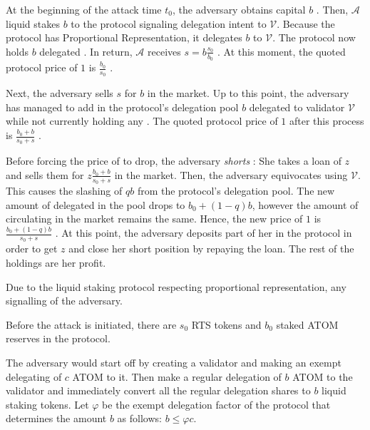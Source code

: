 At the beginning of the attack time $t_0$, the adversary obtains capital
$b$ \asset. Then, $\mathcal{A}$
liquid stakes $b$ \asset to the protocol
signaling delegation intent to $\mathcal{V}$. Because the
protocol has Proportional Representation, it delegates $b$ \asset to $\mathcal{V}$.
The protocol now holds $b$ delegated \asset.
In return, $\mathcal{A}$ receives $s = b \frac{s_0}{b_0}$ \stasset.
At this moment, the quoted protocol price of $1$ \stasset is
$\frac{b_0}{s_0}$ \asset.

Next, the adversary sells $s$ \stasset for $b$ \asset in the market.
Up to this point, the adversary
has managed to add in the protocol's delegation pool $b$
\asset delegated to validator $\mathcal{V}$ while not currently holding
any \stasset. The quoted protocol price of $1$ \stasset after this process
is $\frac{b_0 + b}{s_0 + s}$ \asset.

Before forcing the price of \stasset to drop, the adversary \emph{shorts}
\stasset: She takes a loan of $z$ \stasset and sells them for
$z \frac{b_0 + b}{s_0 + s}$ \asset in the market.
Then, the adversary equivocates using $\mathcal{V}$. This causes the
slashing of $qb$ \asset from the protocol's delegation pool. The new
amount of delegated \asset in the pool drops to $b_0 + (1 - q) b$, however
the amount of \stasset circulating in the market remains the same. Hence,
the new price of $1$ \stasset is $\frac{b_0 + (1 - q) b}{s_0 + s}$ \asset.
At this point, the adversary deposits part of her \asset in the protocol
in order to get $z$ \stasset and close her short position by repaying the loan.
The rest of the \asset holdings are her profit.


Due to the liquid staking protocol respecting proportional
representation, any signalling of the adversary.

Before the attack is initiated, there are $s_0$ RTS tokens and $b_0$
staked ATOM reserves in the protocol.

The adversary would start off by creating a validator and making an
exempt delegating of $c$ ATOM to it.
Then make a regular delegation of $b$ ATOM to the validator and
immediately convert all the regular delegation shares to $b$ liquid
staking tokens.
Let $\varphi$ be the exempt delegation factor of the protocol
that determines the amount $b$ as follows: $b \leq \varphi c$.

